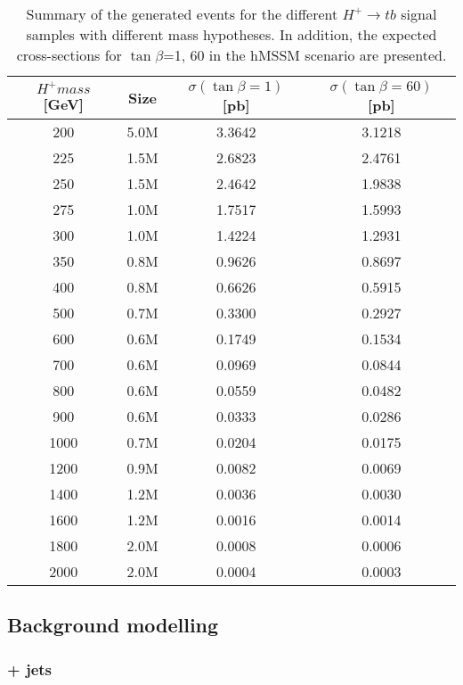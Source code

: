 \begin{table}[htbp]
    \small	
    \begin{tabular}{cccc}
    \toprule\toprule
    $H^+ mass$ [GeV] & Size & $\sigma(\tan\beta=1)$ [pb] &  $\sigma(\tan\beta=60)$ [pb] \\ \midrule
    200 & 5.0M & 3.3642 & 3.1218 \\
    225 & 1.5M & 2.6823 & 2.4761 \\
    250 & 1.5M & 2.4642 & 1.9838 \\
    275 & 1.0M & 1.7517 & 1.5993 \\
    300 & 1.0M & 1.4224 & 1.2931 \\
    350 & 0.8M & 0.9626 & 0.8697 \\
    400 & 0.8M & 0.6626 & 0.5915 \\
    500 & 0.7M & 0.3300 & 0.2927 \\
    600 & 0.6M & 0.1749 & 0.1534 \\
    700 & 0.6M & 0.0969 & 0.0844 \\
    800 & 0.6M & 0.0559 & 0.0482 \\
    900 & 0.6M & 0.0333 & 0.0286 \\
    1000 & 0.7M & 0.0204 & 0.0175 \\
    1200 & 0.9M & 0.0082 & 0.0069 \\
    1400 & 1.2M & 0.0036 & 0.0030 \\
    1600 & 1.2M & 0.0016 & 0.0014 \\
    1800 & 2.0M & 0.0008 & 0.0006 \\
    2000 & 2.0M & 0.0004 & 0.0003 \\
    \bottomrule\bottomrule  
    \end{tabular}                            
    \caption{Summary of the generated events for the different $H^+\to tb$ signal samples with different mass hypotheses. In addition, the expected cross-sections for $\tan\beta$=1, 60 in the hMSSM scenario are presented.}
    \label{Hplustb:MCsummarytable}
\end{table}

\clearpage

\subsection{Background modelling}

\subsubsection{\ttbar+ jets}


